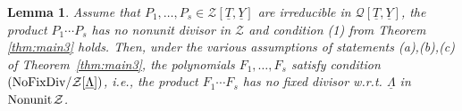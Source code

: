 \documentclass[11pt,a4paper,reqno]{amsart}
\newtheorem{lem}[thm]{Lemma}
\theoremstyle{definition}
\begin{document}
\begin{lem} \label{lemmaHS2}  
Assume that $P_1,\ldots,P_s\in {\mathcal Z}[\underline T, \underline Y]$ are irreducible in ${\mathcal Q}[\underline T, \underline Y]$, the product $P_1\cdots P_s$ has no nonunit divisor in ${\mathcal Z}$ and condition {\rm (1)} from Theorem \ref{thm:main3} holds. Then, under the various assumptions 
of statements {\rm (a)},{\rm (b)},{\rm (c)} of \hbox{\rm Theorem \ref{thm:main3}}, the polynomials $F_1,\ldots,F_s$ satisfy condition $\hbox{\rm (NoFixDiv}/{\mathcal Z}[\underline \Lambda])$, \hbox{i.e.}, the product $F_1\cdots F_s$  has no fixed divisor \hbox{w.r.t.} $\underline{\Lambda}$ in ${\rm Nonunit}\hskip 1pt {\mathcal Z}$. 
\end{lem}

\end{document}
